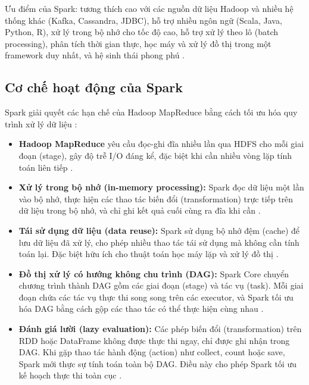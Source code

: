 \documentclass[../BTL.tex]{subfiles}
\begin{document}
Ưu điểm của Spark: tương thích cao với các nguồn dữ liệu Hadoop và nhiều hệ thống khác (Kafka, Cassandra, JDBC), hỗ trợ nhiều ngôn ngữ (Scala, Java, Python, R), xử lý trong bộ nhớ cho tốc độ cao, hỗ trợ xử lý theo lô (batch processing), phân tích thời gian thực, học máy và xử lý đồ thị trong một framework duy nhất, và hệ sinh thái phong phú \cite{spark_definitive, spark_official}.

\subsection{Cơ chế hoạt động của Spark}
Spark giải quyết các hạn chế của Hadoop MapReduce bằng cách tối ưu hóa quy trình xử lý dữ liệu \cite{spark_rdd, spark_definitive}:

\begin{itemize}
    \item \textbf{Hadoop MapReduce} yêu cầu đọc-ghi đĩa nhiều lần qua HDFS cho mỗi giai đoạn (stage), gây độ trễ I/O đáng kể, đặc biệt khi cần nhiều vòng lặp tính toán liên tiếp \cite{hadoop_mapreduce}.

    \item \textbf{Xử lý trong bộ nhớ (in-memory processing):} Spark đọc dữ liệu một lần vào bộ nhớ, thực hiện các thao tác biến đổi (transformation) trực tiếp trên dữ liệu trong bộ nhớ, và chỉ ghi kết quả cuối cùng ra đĩa khi cần \cite{spark_rdd}.

    \item \textbf{Tái sử dụng dữ liệu (data reuse):} Spark sử dụng bộ nhớ đệm (cache) để lưu dữ liệu đã xử lý, cho phép nhiều thao tác tái sử dụng mà không cần tính toán lại. Đặc biệt hữu ích cho thuật toán học máy lặp và xử lý đồ thị \cite{spark_rdd, spark_sql}.

    \item \textbf{Đồ thị xử lý có hướng không chu trình (DAG):} Spark Core chuyển chương trình thành DAG gồm các giai đoạn (stage) và tác vụ (task). Mỗi giai đoạn chứa các tác vụ thực thi song song trên các executor, và Spark tối ưu hóa DAG bằng cách gộp các thao tác có thể thực hiện cùng nhau \cite{spark_rdd}.

    \item \textbf{Đánh giá lười (lazy evaluation):} Các phép biến đổi (transformation) trên RDD hoặc DataFrame không được thực thi ngay, chỉ được ghi nhận trong DAG. Khi gặp thao tác hành động (action) như collect, count hoặc save, Spark mới thực sự tính toán toàn bộ DAG. Điều này cho phép Spark tối ưu kế hoạch thực thi toàn cục \cite{spark_sql}.
\end{itemize}
\end{document}
